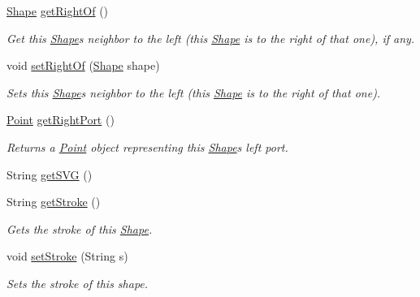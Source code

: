 \begin{DoxyCompactItemize}
\hyperlink{classcom_1_1aarrelaakso_1_1drawl_1_1_shape}{Shape} \hyperlink{classcom_1_1aarrelaakso_1_1drawl_1_1_shape_a1ad573b06f341aa79f6a255a476ae6e4}{get\+Right\+Of} ()
\begin{DoxyCompactList}\small\item\em Get this \hyperlink{classcom_1_1aarrelaakso_1_1drawl_1_1_shape}{Shape}\textquotesingle{}s neighbor to the left (this \hyperlink{classcom_1_1aarrelaakso_1_1drawl_1_1_shape}{Shape} is to the right of that one), if any. \end{DoxyCompactList}\item 
void \hyperlink{classcom_1_1aarrelaakso_1_1drawl_1_1_shape_a09e1586ce85c1d964cc3b7ce94bc5d4c}{set\+Right\+Of} (\hyperlink{classcom_1_1aarrelaakso_1_1drawl_1_1_shape}{Shape} shape)
\begin{DoxyCompactList}\small\item\em Sets this \hyperlink{classcom_1_1aarrelaakso_1_1drawl_1_1_shape}{Shape}\textquotesingle{}s neighbor to the left (this \hyperlink{classcom_1_1aarrelaakso_1_1drawl_1_1_shape}{Shape} is to the right of that one). \end{DoxyCompactList}\item 
\hyperlink{classcom_1_1aarrelaakso_1_1drawl_1_1_point}{Point} \hyperlink{classcom_1_1aarrelaakso_1_1drawl_1_1_shape_a319c78d425ec91e1aef1072a95e349ad}{get\+Right\+Port} ()
\begin{DoxyCompactList}\small\item\em Returns a \hyperlink{classcom_1_1aarrelaakso_1_1drawl_1_1_point}{Point} object representing this \hyperlink{classcom_1_1aarrelaakso_1_1drawl_1_1_shape}{Shape}\textquotesingle{}s left port. \end{DoxyCompactList}\item 
String \hyperlink{classcom_1_1aarrelaakso_1_1drawl_1_1_shape_aca74cc0c71117040f28329744eebde9d}{get\+S\+VG} ()
\item 
String \hyperlink{classcom_1_1aarrelaakso_1_1drawl_1_1_shape_a4e1d54c7e161e3af5053939ddefdf9e6}{get\+Stroke} ()
\begin{DoxyCompactList}\small\item\em Gets the stroke of this \hyperlink{classcom_1_1aarrelaakso_1_1drawl_1_1_shape}{Shape}. \end{DoxyCompactList}\item 
void \hyperlink{classcom_1_1aarrelaakso_1_1drawl_1_1_shape_a3930f6fe72f6c5e0c0aa4c25ffbf18ff}{set\+Stroke} (String s)
\begin{DoxyCompactList}\small\item\em Sets the stroke of this shape. \end{DoxyCompactList}\item 

\end{DoxyCompactItemize}
